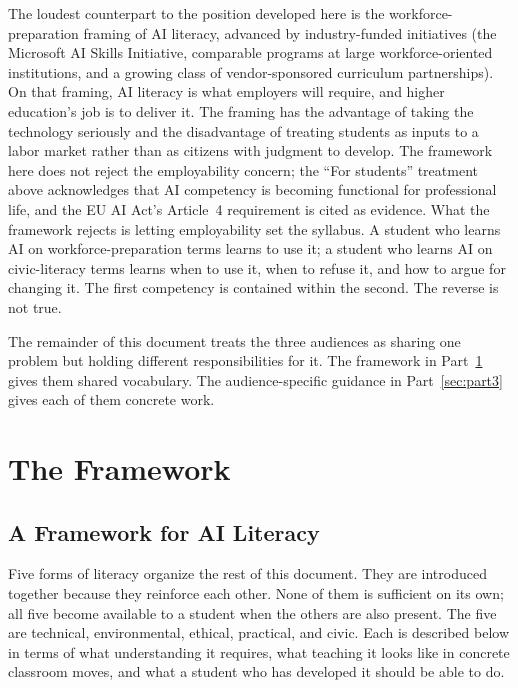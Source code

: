 \documentclass[12pt]{article}
\begin{document}
The loudest counterpart to the position developed here is the workforce-preparation framing of AI literacy, advanced by industry-funded initiatives (the Microsoft AI Skills Initiative, comparable programs at large workforce-oriented institutions, and a growing class of vendor-sponsored curriculum partnerships). On that framing, AI literacy is what employers will require, and higher education's job is to deliver it. The framing has the advantage of taking the technology seriously and the disadvantage of treating students as inputs to a labor market rather than as citizens with judgment to develop. The framework here does not reject the employability concern; the ``For students'' treatment above acknowledges that AI competency is becoming functional for professional life, and the EU AI Act's Article~4 requirement is cited as evidence. What the framework rejects is letting employability set the syllabus. A student who learns AI on workforce-preparation terms learns to use it; a student who learns AI on civic-literacy terms learns when to use it, when to refuse it, and how to argue for changing it. The first competency is contained within the second. The reverse is not true.

The remainder of this document treats the three audiences as sharing one problem but holding different responsibilities for it. The framework in Part~\ref{sec:part2} gives them shared vocabulary. The audience-specific guidance in Part~\ref{sec:part3} gives each of them concrete work.

\section{The Framework}
\label{sec:part2}

\subsection{A Framework for AI Literacy}
\label{sec:II.1}

Five forms of literacy organize the rest of this document. They are introduced together because they reinforce each other. None of them is sufficient on its own; all five become available to a student when the others are also present. The five are technical, environmental, ethical, practical, and civic. Each is described below in terms of what understanding it requires, what teaching it looks like in concrete classroom moves, and what a student who has developed it should be able to do.
\end{document}
